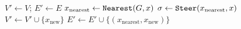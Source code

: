 \begin{algorithm}[H]
    $V' \leftarrow V$; $E' \leftarrow E$\;
    $x_\mathrm{nearest} \leftarrow {\tt Nearest} (G,x)$\; 
    $\sigma \leftarrow {\tt Steer} (x_\mathrm{nearest}, x)$\; 
    {
        $V' \leftarrow V' \cup \{x_\mathrm{new}\}$\; 
        $E' \leftarrow E' \cup \{ (x_\mathrm{nearest}, x_\mathrm{new})\}$\; 
    }
    \caption{ ${\tt Extend}_{RRT} ((V,E), x)$ }
    \label{algorithm:rrt_extend}
\end{algorithm}